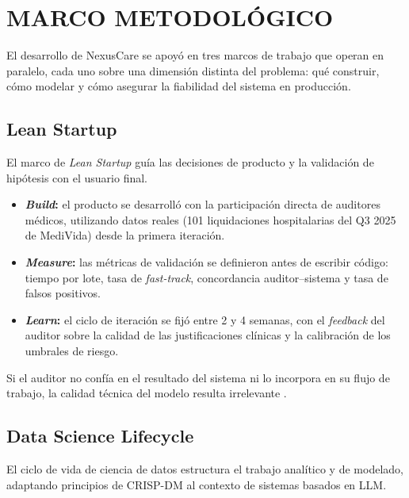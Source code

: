 
\chapter{MARCO METODOLÓGICO}
El desarrollo de NexusCare se apoyó en tres marcos de trabajo que operan en paralelo, cada uno sobre una dimensión distinta del problema: qué construir, cómo modelar y cómo asegurar la fiabilidad del sistema en producción.

\section{Lean Startup}

El marco de \textit{Lean Startup} \cite{ries2011lean,blank2013lean} guía las decisiones de producto y la validación de hipótesis con el usuario final.

\begin{itemize}
     \item \textbf{\textit{Build}:} el producto se desarrolló con la participación directa de auditores médicos, utilizando datos reales (101 liquidaciones hospitalarias del Q3 2025 de MediVida) desde la primera iteración.
    \item \textbf{\textit{Measure}:} las métricas de validación se definieron antes de escribir código: tiempo por lote, tasa de \textit{fast-track}, concordancia auditor–sistema y tasa de falsos positivos.
    \item \textbf{\textit{Learn}:} el ciclo de iteración se fijó entre 2 y 4 semanas, con el \textit{feedback} del auditor sobre la calidad de las justificaciones clínicas y la calibración de los umbrales de riesgo.
\end{itemize}
Si el auditor no confía en el resultado del sistema ni lo incorpora en su flujo de trabajo, la calidad técnica del modelo resulta irrelevante \cite{char2018ethical}.

\section{Data Science Lifecycle}

El ciclo de vida de ciencia de datos estructura el trabajo analítico y de modelado, adaptando principios de CRISP-DM al contexto de sistemas basados en LLM.

